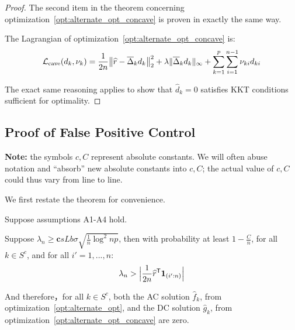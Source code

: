 \begin{proof}
The second item in the theorem concerning optimization~\ref{opt:alternate_opt_concave} is proven in exactly the same way. 

The Lagrangian of optimization~\ref{opt:alternate_opt_concave} is:
\[
\mathcal{L}_{\textrm{cave}}(d_k, \nu_k) = 
  \frac{1}{2n} \big\| \widehat{r} - \overline{\Delta}_k d_k \big \|_2^2 + 
  \lambda \| \overline{\Delta}_k d_k \|_\infty + \sum_{k=1}^p \sum_{i=1}^{n-1} \nu_{ki} d_{ki}
\]

The exact same reasoning applies to show that $\hat{d}_k = 0$ satisfies KKT conditions sufficient for optimality.

\end{proof}
 
 
 
 
 
 
 \subsection{Proof of False Positive Control}
 \label{sec:false_positive_proof}
 
\textbf{Note:} the symbols $c,C$ represent absolute constants. We will often abuse notation and ``absorb'' new absolute constants into $c, C$; the actual value of $c, C$ could thus vary from line to line.

 We first restate the theorem for convenience. 
 

\begin{theorem} 
Suppose assumptions A1-A4 hold. 

Suppose $\lambda_n \geq \mathbf{c} s Lb \sigma  \sqrt{ \frac{1}{n} \log^2 np}$, then with probability at least $ 1 - \frac{C}{n}$, for all $k \in S^c$, and for all $i'=1,...,n$:
\[
\lambda_n > \Big| \frac{1}{2n}\widehat{r}^{\mathsf{T}} \mbox{\boldmath $1$}_{(i':n)} \Big|
\]

And therefore，for all $k \in S^c$, both the AC solution $\hat{f}_k$, from optimization~\ref{opt:alternate_opt}, and the DC solution $\hat{g}_k$, from optimization~\ref{opt:alternate_opt_concave} are zero. 
\end{theorem}

